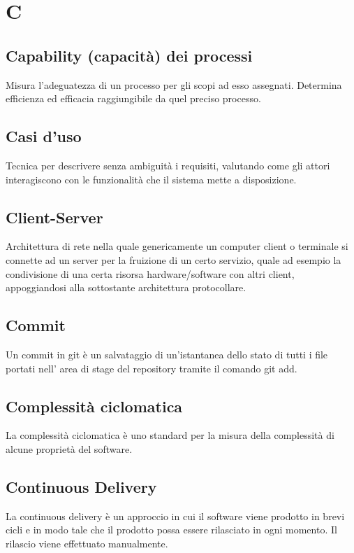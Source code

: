 {	\section{C}
	\subsection{Capability (capacità) dei processi}
	Misura l'adeguatezza di un processo per gli scopi ad esso assegnati. Determina efficienza ed efficacia raggiungibile da quel preciso processo.
	
	\subsection{Casi d'uso}
	Tecnica per descrivere senza ambiguità i requisiti, valutando come gli attori interagiscono con le funzionalità che il sistema mette a disposizione.
		
	\subsection{Client-Server}
	Architettura di rete nella quale genericamente un computer client o terminale si connette ad un server per la fruizione di un certo servizio, quale ad esempio la condivisione di una certa risorsa hardware/software con altri client, appoggiandosi alla sottostante architettura protocollare.
		
	\subsection{Commit}
	Un commit in git è un salvataggio di un'istantanea dello stato di tutti i file portati nell' area di stage del repository tramite il comando git add.
	
	\subsection{Complessità ciclomatica}
	La complessità ciclomatica è uno standard per la misura della complessità di alcune proprietà del software.
	\subsection{Continuous Delivery}
	La continuous delivery è un approccio in cui il software viene prodotto in brevi cicli e in modo tale che il prodotto possa essere rilasciato in ogni momento. Il rilascio viene effettuato manualmente.
	
}
